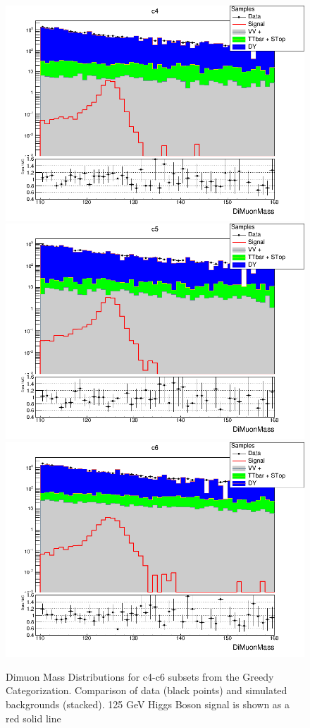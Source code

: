 \begin{figure}[htbp]
  \centering
  \includegraphics[width=0.65\linewidth]{figures/ch_higgs/distributions/bdt_uf/distribution__c4__DiMuonMass__logY.png}\\
  \includegraphics[width=0.65\linewidth]{figures/ch_higgs/distributions/bdt_uf/distribution__c5__DiMuonMass__logY.png}\\
  \includegraphics[width=0.65\linewidth]{figures/ch_higgs/distributions/bdt_uf/distribution__c6__DiMuonMass__logY.png}
  \caption{Dimuon Mass Distributions for c4-c6 subsets from the Greedy Categorization. Comparison of data (black points) and simulated backgrounds (stacked). 125 GeV Higgs Boson signal is shown as a red solid line}
  \label{fig:higgs_categorization_greedyc4c6}
\end{figure}
